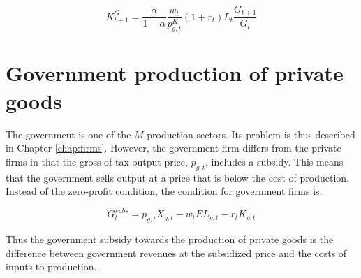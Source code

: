 \begin{equation}
K^{G}_{t+1} = \frac{\alpha}{1-\alpha}\frac{w_{t}}{p^{K}_{g,t}}(1+r_{t})L_{t}\frac{G_{t+1}}{G_{t}}
\end{equation}

\section{Government production of private goods}

The government is one of the $M$ production sectors.  Its problem is thus described in Chapter \ref{chap:firms}.  However, the government firm differs from the private firms in that the gross-of-tax output price, $p_{g,t}$, includes a subsidy.  This means that the government sells output at a price that is below the cost of production. Instead of the zero-profit condition, the condition for government firms is:

\begin{equation}
G^{subs}_{t} = p_{g,t}X_{g,t} - w_{t}EL_{g,t} - r_{t}K_{g,t}
\end{equation}

\noindent\noindent  Thus the government subsidy towards the production of private goods is the difference between government revenues at the subsidized price and the costs of inputs to production.






